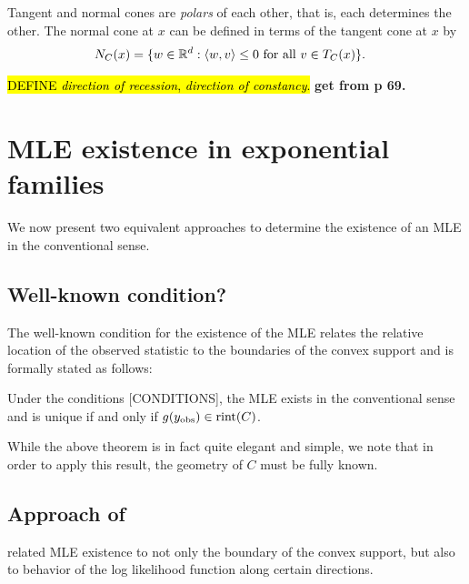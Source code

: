 Tangent and normal cones are \emph{polars} of each other, that is, each determines the other.  
The normal cone at $x$ can be defined in terms of the tangent cone at $x$ by
\begin{align*}
	N_C(x) 	&= \{ w \in {\mathbb R}^d: \langle  w, v  \rangle \leq 0 \text{ for all } v \in T_C(x) \}.
\end{align*}

\hl{DEFINE \emph{direction of recession}, \emph{direction of constancy}.}  \textbf{get from 
\citep{Rockafellar:1970} p 69.}



\section{MLE existence in exponential families}
We now present two equivalent approaches to determine the existence of an MLE
in the conventional sense.  

\subsection{Well-known condition?}
The well-known condition for the existence of the MLE \citep{Barndorff, Brown:1986} 
relates the relative location
of the observed statistic to the boundaries of the convex support
and is formally stated as follows:
\begin{theorem} \label{Thm:MLE rint}
Under the conditions [CONDITIONS], the MLE exists in the conventional sense and is 
unique if and only if 
$g(y_{\textrm{obs}}) \in \operatorname{rint}(C)$.
\end{theorem}

While the above theorem is in fact quite elegant and simple, we note that in order to apply this result, the geometry of $C$ must be fully known.

\subsection{Approach of \citet{Geyer:gdor}}
\citet{Geyer:1990,Geyer:gdor} related MLE existence to
 not only the boundary of the convex support, but also to behavior of the log likelihood function along certain directions.

